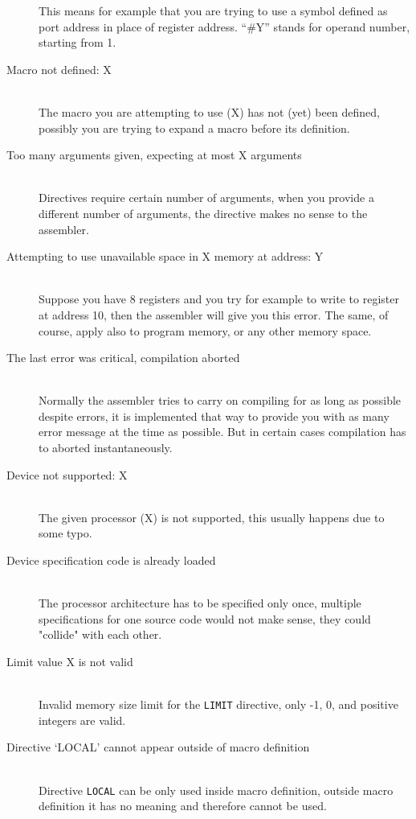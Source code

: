 \begin{description}
            This means for example that you are trying to use a symbol defined as port address in place of register address. ``\#Y'' stands for operand number, starting from 1.
        \item[Macro not defined: X]~\\
            The macro you are attempting to use (X) has not (yet) been defined, possibly you are trying to expand a macro before its definition.
        \item[Too many arguments given, expecting at most X arguments]~\\
            Directives require certain number of arguments, when you provide a different number of arguments, the directive makes no sense to the assembler.
        \item[Attempting to use unavailable space in X memory at address: Y]~\\
            Suppose you have 8 registers and you try for example to write to register at address 10, then the assembler will give you this error. The same, of course, apply also to program memory, or any other memory space.
        \item[The last error was critical, compilation aborted]~\\
            Normally the assembler tries to carry on compiling for as long as possible despite errors, it is implemented that way to provide you with as many error message at the time as possible. But in certain cases compilation has to aborted instantaneously.
        \item[Device not supported: X]~\\
            The given processor (X) is not supported, this usually happens due to some typo.
        \item[Device specification code is already loaded ]~\\
            The processor architecture has to be specified only once, multiple specifications for one source code would not make sense, they could "collide" with each other.
        \item[Limit value X is not valid]~\\
            Invalid memory size limit for the \texttt{LIMIT} directive, only -1, 0, and positive integers are valid.
        \item[Directive `LOCAL' cannot appear outside of macro definition ]~\\
            Directive \texttt{LOCAL} can be only used inside macro definition, outside macro definition it has no meaning and therefore cannot be used.

\end{description}
